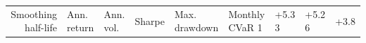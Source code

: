 \begin{tabular}{rlllllll}
\toprule
Smoothing half-life & Ann. return & Ann. vol. & Sharpe & Max. drawdown & Monthly CVaR 1%
 & +5.3%
3 & +5.2%
6 & +3.8%
\bottomrule
\end{tabular}
